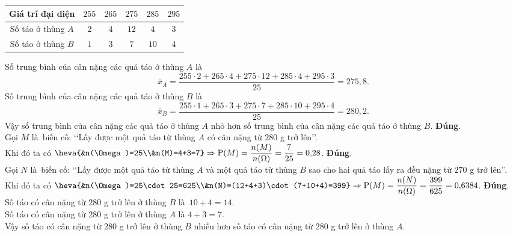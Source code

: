 \begin{ex}
{\begin{itemchoice}
\begin{center}
{\begin{tabular}{|c|c|c|c|c|c|}
			 \hline
			Giá trí đại diện & $255$ & $265$ & $275$  & $285$ & $295$\\
			 \hline
			Số táo ở thùng $A$  & $2$ & $4$ & $12$ & $4$ & $3$\\
			 \hline
			Số táo ở  thùng $B$ & $1$ & $3$ & $7$ & $10$ & $4$\\
			 \hline
		\end{tabular}}
	\end{center}
	Số trung bình của cân nặng các quả táo ở thùng $A$ là 
	\[\overline{x}_A=\dfrac{255\cdot2+265\cdot4+275\cdot12+285\cdot4+295\cdot3}{25}=275{,}8.\] 
	Số trung bình của cân nặng các quả táo ở  thùng $B$ là
	\[\overline{x}_B=\dfrac{255\cdot1+265\cdot3+275\cdot7+285\cdot10+295\cdot4}{25}=280{,}2.\] 
	Vậy số trung bình của cân nặng các quả táo ở thùng  $A$ nhỏ hơn số trung bình của cân nặng các quả táo ở thùng $B$.
	\itemch  \textbf{Đúng}.\\
	Gọi $M$ là~biến cố: \lq\lq Lấy được một  quả táo từ thùng $A$ có cân nặng từ $280$ g trở lên\rq\rq.\\
	Khi đó ta  có $\heva{&n(\Omega)=25\\&n(M)=4+3=7}\Rightarrow\mathrm{P}(M)=\dfrac{n(M)}{n(\Omega)}=\dfrac{7}{25}=0{,}28$.
	\itemch \textbf{Đúng}.\\ 
	Gọi $N$ là~biến cố: \lq\lq Lấy được một quả táo từ  thùng $A$ và một quả táo từ thùng $B$ sao cho hai quả táo lấy ra đều nặng từ $270$ g trở lên\rq\rq.\\
	Khi đó ta  có $\heva{&n(\Omega)=25\cdot25=625\\&n(N)=(12+4+3)\cdot(7+10+4)=399}\Rightarrow\mathrm{P}(M)=\dfrac{n(N)}{n(\Omega)}=\dfrac{399}{625}=0{,}6384$.
	 \itemch \textbf{Đúng}.\\
	Số  táo có cân nặng từ $280$ g trở lên ở thùng $B$ là~$10+4=14$.\\
	Số táo có cân nặng từ $280$ g trở lên ở thùng $A$  là
	$4+3=7$.\\ 
	Vậy số táo có cân nặng từ $280$ g trở lên ở thùng $B$ nhiều hơn số táo có cân nặng từ $280$ g trở lên ở thùng $A$. 
	\end{itemchoice}
 }
\end{ex}

